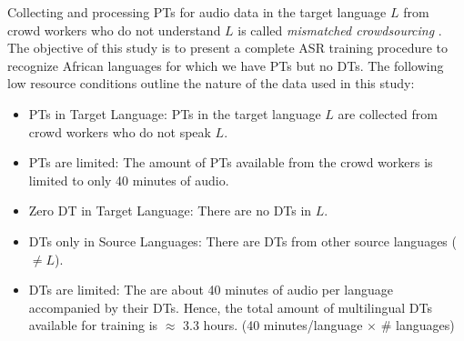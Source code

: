 \documentclass[a4paper]{article}
\begin{document}
Collecting and processing PTs for audio data in the target language $L$ from crowd workers who do not understand $L$ is called \emph{mismatched crowdsourcing} \cite{Jyothi-MismatchedCrowdsourcingTrans}. %
The objective of this study is to present a complete ASR training procedure to recognize African languages for which we have PTs but no DTs. The following low resource conditions outline the nature of the data used in this study:  \vspace{-1mm}
\begin{itemize}[leftmargin=*]
\item PTs in Target Language: PTs in the target language $L$ are collected from crowd workers who do not speak $L$. \vspace{-1.5mm}
\item PTs are limited: The amount of PTs available from the crowd workers is limited to only 40 minutes of audio.  \vspace{-1mm}
\item Zero DT in Target Language: There are no DTs in $L$.  \vspace{-1mm}
\item DTs only in Source Languages: There are DTs from other source languages ($\ne L$).  \vspace{-1mm}
\item DTs are limited: The are about 40 minutes of audio per language accompanied by their DTs. Hence, the total amount of multilingual DTs available for training is $\approx$ 3.3 hours. (40 minutes/language $\times$ \# languages)  \vspace{-1mm}
\end{itemize}
\end{document}
